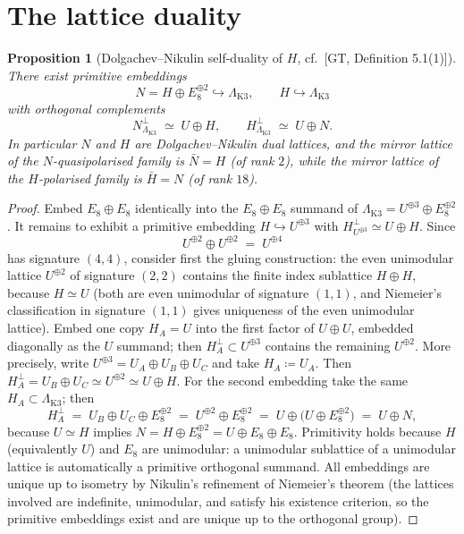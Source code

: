 \documentclass[11pt]{article}
\newtheorem{proposition}[theorem]{Proposition}
\begin{document}
\section{The lattice duality}\label{sec:lattice-duality}

\begin{proposition}[Dolgachev--Nikulin self-duality of $H$,
{cf.\ [GT, Definition 5.1(1)]}]\label{prop:DN}
There exist primitive embeddings
\[
N=H\oplus E_8^{\oplus 2}\hookrightarrow\Lambda_{\mathrm{K3}},
\qquad
H\hookrightarrow\Lambda_{\mathrm{K3}}
\]
with orthogonal complements
\[
N^{\perp}_{\Lambda_{\mathrm{K3}}}\;\simeq\;U\oplus H,
\qquad
H^{\perp}_{\Lambda_{\mathrm{K3}}}\;\simeq\;U\oplus N.
\]
In particular $N$ and $H$ are Dolgachev--Nikulin dual lattices, and the
mirror lattice of the $N$-quasipolarised family is $\bar N=H$ (of rank
$2$), while the mirror lattice of the $H$-polarised family is
$\bar H = N$ (of rank $18$).
\end{proposition}

\begin{proof}
Embed $E_8\oplus E_8$ identically into the $E_8\oplus E_8$ summand of
$\Lambda_{\mathrm{K3}}=U^{\oplus3}\oplus E_8^{\oplus2}$. It remains to
exhibit a primitive embedding $H\hookrightarrow U^{\oplus 3}$ with
$H^{\perp}_{U^{\oplus3}}\simeq U\oplus H$. Since
\[
U^{\oplus 2}\oplus U^{\oplus 2}\;=\;U^{\oplus 4}
\]
has signature $(4,4)$, consider first the gluing construction: the even
unimodular lattice $U^{\oplus2}$ of signature $(2,2)$ contains the finite
index sublattice $H\oplus H$, because $H\simeq U$ (both are even unimodular
of signature $(1,1)$, and Niemeier's classification in signature $(1,1)$
gives uniqueness of the even unimodular lattice). Embed one copy $H_A=U$
into the first factor of $U\oplus U$, embedded diagonally as the $U$
summand; then $H_A^{\perp}\subset U^{\oplus3}$ contains the remaining
$U^{\oplus2}$. More precisely, write
$U^{\oplus3}=U_A\oplus U_B\oplus U_C$ and take
$H_A \coloneqq U_A$. Then
$H_A^{\perp}=U_B\oplus U_C\simeq U^{\oplus2}\simeq U\oplus H$.
For the second embedding take the same $H_A\subset\Lambda_{\mathrm{K3}}$;
then
\[
H_A^{\perp}\;=\;U_B\oplus U_C\oplus E_8^{\oplus2}
\;=\;U^{\oplus 2}\oplus E_8^{\oplus2}
\;=\;U\oplus\bigl(U\oplus E_8^{\oplus 2}\bigr)
\;=\;U\oplus N,
\]
because $U\simeq H$ implies
$N=H\oplus E_8^{\oplus2}=U\oplus E_8\oplus E_8$.
Primitivity holds because $H$ (equivalently $U$) and $E_8$ are unimodular:
a unimodular sublattice of a unimodular lattice is automatically a primitive
orthogonal summand. All embeddings are unique up to isometry by Nikulin's
refinement of Niemeier's theorem (the lattices involved are indefinite,
unimodular, and satisfy his existence criterion, so the primitive embeddings
exist and are unique up to the orthogonal group).
\end{proof}
\end{document}
